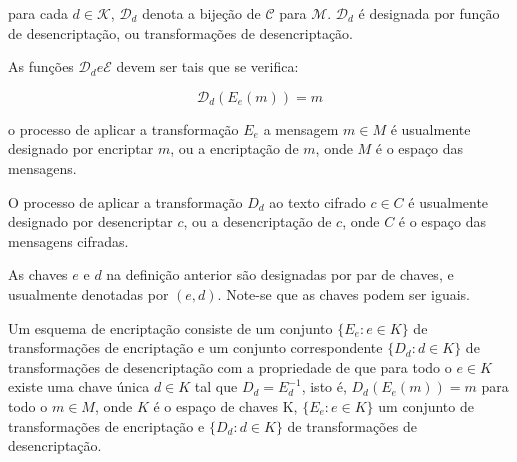 \begin{definicao} para cada $d \in \mathcal{K}$, $\mathcal{D}_d$ denota a bijeção de $\mathcal{C}$ para $\mathcal{M}$. $\mathcal{D}_d$ é designada por função de desencriptação, ou transformações de desencriptação.
\end{definicao} As funções $\mathcal{D}_d e \mathcal{E}$ devem ser tais que se verifica:

$$\mathcal{D}_d(E_e(m))=m$$

\begin{definicao} [Encriptaçao] o processo de aplicar a transformação $E_e$ a mensagem $m \in M$ é usualmente designado por encriptar $m$, ou a encriptação de $m$, onde $M$ é o espaço das mensagens.
\end{definicao}

\begin{definicao}[Desencriptação]
O processo de aplicar a transformação $D_d$ ao texto cifrado $c \in C$ é usualmente designado por desencriptar $c$, ou a desencriptação de $c$, onde $C$ é o espaço das mensagens cifradas.
\end{definicao}

\begin{definicao}  As chaves $e$ e $d$ na definição anterior são designadas por par de chaves, e usualmente denotadas por $(e,d)$. Note-se que as chaves podem ser iguais.
\end{definicao}

\begin{definicao} Um esquema de encriptação consiste de um conjunto $\{E_e : e \in K\}$ de transformações de encriptação e um conjunto correspondente $\{D_d:d \in K\}$ de transformações de desencriptação com a propriedade de que para todo o $e \in K$ existe uma chave única $d \in K$ tal  que $D_d=E_d^{-1}$, isto é, $D_d(E_e(m))=m$ para todo o $m \in M$, onde $K$ é o espaço de chaves K, $\{E_e :e \in K\}$ um conjunto de transformações de encriptação e $\{D_d :d \in K\}$ de transformações de desencriptação.
\end{definicao}


